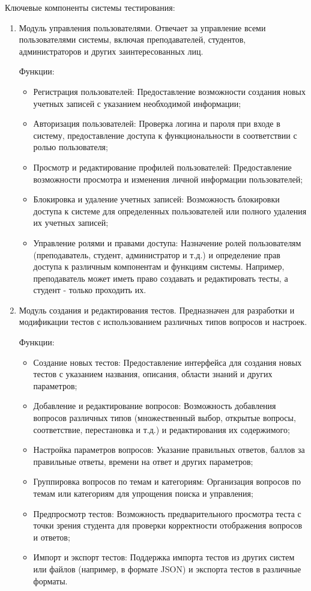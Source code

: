 Ключевые компоненты системы тестирования:

\begin{enumerate}
	\item Модуль управления пользователями. Отвечает за управление всеми пользователями системы, включая преподавателей, студентов, администраторов и других заинтересованных лиц.
	
	Функции:
	\begin{itemize}
		\item Регистрация пользователей: Предоставление возможности создания новых учетных записей с указанием необходимой информации;
		\item Авторизация пользователей: Проверка логина и пароля при входе в систему, предоставление доступа к функциональности в соответствии с ролью пользователя;
		\item Просмотр и редактирование профилей пользователей: Предоставление возможности просмотра и изменения личной информации пользователей;
		\item Блокировка и удаление учетных записей: Возможность блокировки доступа к системе для определенных пользователей или полного удаления их учетных записей;
		\item Управление ролями и правами доступа: Назначение ролей пользователям (преподаватель, студент, администратор и т.д.) и определение прав доступа к различным компонентам и функциям системы. Например, преподаватель может иметь право создавать и редактировать тесты, а студент - только проходить их.
	\end{itemize}
	
	\item Модуль создания и редактирования тестов. Предназначен для разработки и модификации тестов с использованием различных типов вопросов и настроек.
	
	Функции:
	
	\begin{itemize}
		\item Создание новых тестов: Предоставление интерфейса для создания новых тестов с указанием названия, описания, области знаний и других параметров;
		\item Добавление и редактирование вопросов: Возможность добавления вопросов различных типов (множественный выбор, открытые вопросы, соответствие, перестановка и т.д.) и редактирования их содержимого;
		\item Настройка параметров вопросов: Указание правильных ответов, баллов за правильные ответы, времени на ответ и других параметров;
		\item Группировка вопросов по темам и категориям: Организация вопросов по темам или категориям для упрощения поиска и управления;
		\item Предпросмотр тестов: Возможность предварительного просмотра теста с точки зрения студента для проверки корректности отображения вопросов и ответов;
		\item Импорт и экспорт тестов: Поддержка импорта тестов из других систем или файлов (например, в формате JSON) и экспорта тестов в различные форматы.
	\end{itemize}
	

\end{enumerate}

